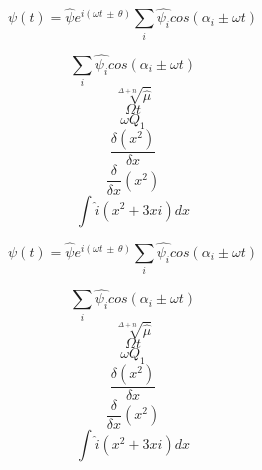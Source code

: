 \documentclass{article}
\begin{document}
\[\psi (t)=\hat{\psi}e^{i(\omega t\, \pm\, \theta)}\sum_i \hat{\psi_i} cos(\alpha_i \pm \omega t)\]

\[\sum_i \hat{\psi_i} cos(\alpha_i \pm \omega t)\]
\[\sqrt[{\Delta+n}] {\hat {\mu}}\]
\[\Omega t\]
\[\omega Q_{1}\]
\[\frac{\delta (x^2)}{\delta x}\]
\[\frac{\delta}{\delta x} (x^2)\]
\[\int \hat{i}(x^2+3xi)dx\]

\begin{huge}
\[\psi (t)=\hat{\psi}e^{i(\omega t\, \pm\, \theta)}\sum_i \hat{\psi_i} cos(\alpha_i \pm \omega t)\]

\[\sum_i \hat{\psi_i} cos(\alpha_i \pm \omega t)\]
\[\sqrt[{\Delta+n}] {\hat {\mu}}\]
\[\Omega t\]
\[\omega Q_{1}\]
\[\frac{\delta (x^2)}{\delta x}\]
\[\frac{\delta}{\delta x} (x^2)\]
\[\int \hat{i}(x^2+3xi)dx\]
\end{huge}
\end{document}
